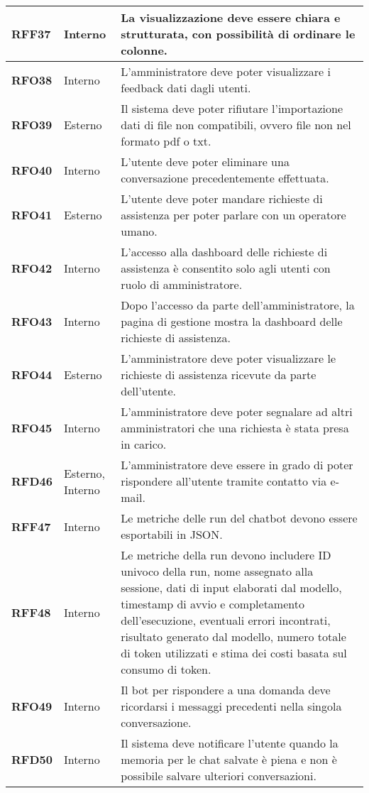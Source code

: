 \begin{longtable}{|>{\centering\arraybackslash}m{}|>{\centering\arraybackslash}m{}|>{\arraybackslash}m{}|}
	\hline
	\textbf{RFF37} & Interno 			& La visualizzazione deve essere chiara e strutturata, con possibilità di ordinare le colonne. \\
	\hline
	\textbf{RFO38} & Interno 			& L'amministratore deve poter visualizzare i feedback dati dagli utenti. \\
	\hline
	\textbf{RFO39} & Esterno 			& Il sistema deve poter rifiutare l'importazione dati di file non compatibili, ovvero file non nel formato pdf o txt. \\
	\hline
	\textbf{RFO40} & Interno 			& L'utente deve poter eliminare una conversazione precedentemente effettuata. \\
	\hline
	\textbf{RFO41} & Esterno 			& L'utente deve poter mandare richieste di assistenza per poter parlare con un operatore umano. \\
	\hline
	\textbf{RFO42} & Interno 			& L’accesso alla dashboard delle richieste di assistenza è consentito solo agli utenti con ruolo di amministratore. \\
	\hline
	\textbf{RFO43} & Interno 			& Dopo l’accesso da parte dell'amministratore, la pagina di gestione mostra la dashboard delle richieste di assistenza. \\
	\hline
	\textbf{RFO44} & Esterno 			& L'amministratore deve poter visualizzare le richieste di assistenza ricevute da parte dell'utente. \\
	\hline
	\textbf{RFO45} & Interno 			& L'amministratore deve poter segnalare ad altri amministratori che una richiesta è stata presa in carico. \\
	\hline
	\textbf{RFD46} & Esterno, Interno 	& L'amministratore deve essere in grado di poter rispondere all'utente tramite contatto via e-mail. \\
	\hline
	\textbf{RFF47} & Interno 			& Le metriche delle run del chatbot devono essere esportabili in JSON. \\
	\hline
	\textbf{RFF48} & Interno 			& Le metriche della run devono includere ID univoco della run, nome assegnato alla sessione, dati di input elaborati dal modello, timestamp di avvio e completamento dell'esecuzione, eventuali errori incontrati, risultato generato dal modello, numero totale di token utilizzati e stima dei costi basata sul consumo di token. \\
	\hline
	\textbf{RFO49} & Interno 			& Il bot per rispondere a una domanda deve ricordarsi i messaggi precedenti nella singola conversazione. \\
	\hline
	\textbf{RFD50} & Interno 			& Il sistema deve notificare l'utente quando la memoria per le chat salvate è piena e non è possibile salvare ulteriori conversazioni. \\

\end{longtable}
